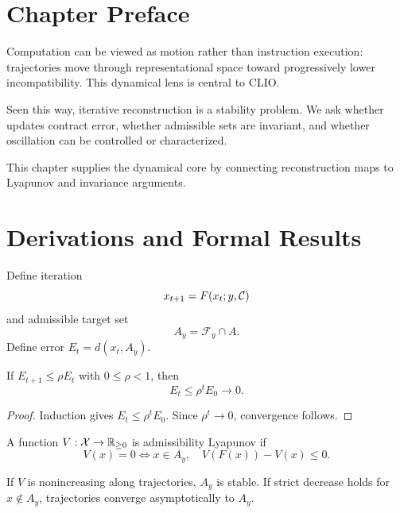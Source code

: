 \section{Chapter Preface}
Computation can be viewed as motion rather than instruction execution: trajectories move through representational space toward progressively lower incompatibility. This dynamical lens is central to CLIO.

Seen this way, iterative reconstruction is a stability problem. We ask whether updates contract error, whether admissible sets are invariant, and whether oscillation can be controlled or characterized.

This chapter supplies the dynamical core by connecting reconstruction maps to Lyapunov and invariance arguments.

\section{Derivations and Formal Results}
Define iteration
\[
x_{t+1}=F(x_t;y,\mathcal{C})
\]
and admissible target set
\[
A_y=\mathcal F_y\cap A.
\]
Define error \(E_t=d(x_t,A_y)\).

\begin{theorem}
If \(E_{t+1}\le\rho E_t\) with \(0\le\rho<1\), then
\[
E_t\le\rho^tE_0\to0.
\]
\end{theorem}

\begin{proof}
Induction gives \(E_t\le\rho^tE_0\). Since \(\rho^t\to0\), convergence follows.
\end{proof}

\begin{definition}
A function \(V:\mathcal{X}\to\mathbb R_{\ge0}\) is admissibility Lyapunov if
\[
V(x)=0\iff x\in A_y,
\quad
V(F(x))-V(x)\le0.
\]
\end{definition}

\begin{theorem}
If \(V\) is nonincreasing along trajectories, \(A_y\) is stable. If strict decrease holds for \(x\notin A_y\), trajectories converge asymptotically to \(A_y\).
\end{theorem}
